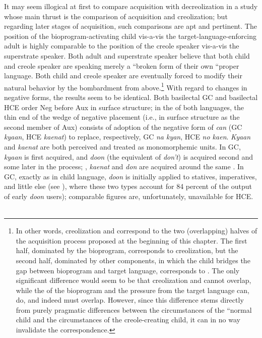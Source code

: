 It may seem illogical at first to compare acquisition with de\-creolization in a study whose main thrust is the comparison of acquisi\-tion and creolization; but regarding later stages of acquisition, such comparisons are apt and pertinent. The position of the bioprogram-activating child vis-a-vis the target-language-enforcing adult is highly comparable to the position of the creole speaker vis-a-vis the superstrate speaker. Both adult and superstrate speaker believe that both child and creole speaker are speaking merely a ``broken form of their own ``proper language. Both child and creole speaker are eventually forced to modify their natural behavior by the bombardment from above.\footnote{In other words, creolization and  correspond to the two (overlapping) halves of the acquisition process proposed at the beginning of this chapter. The first half, dominated by the bioprogram, corresponds to creolization, but the second half, dominated by other components, in which the child bridges the gap between bioprogram and target language, corresponds to . The only significant difference would seem to be that creolization and  cannot overlap, while the  of the bioprogram and the pressure from the target language can, do, and indeed must overlap. However, since this difference stems directly from purely pragmatic differences between the circumstances of the ``normal child and the circumstances of the creole-creating child, it can in no way invalidate the correspondence.} With regard to changes in negative forms, the results seem to be identical. Both basilectal GC and basilectal HCE order Neg
before Aux in surface structure; in the  of both languages, the thin end of the wedge of  negative placement (i.e., in surface structure as the second member of Aux) consists of adoption of the negative form of \textit{can} (GC \textit{kyaan}, HCE \textit{kaenat}) to replace, respectively, GC \textit{na kyan}, HCE \textit{no kaen}. \textit{Kyaan} and \textit{kaenat} are both perceived and treated as monomorphemic units. In GC, \textit{kyaan} is first acquired, and \textit{doon} (the equivalent of \textit{don't}) is acquired second and some  later in the  process; , \textit{kaenat} and \textit{don} are acquired around the same . In GC, exactly as in child language, \textit{doon} is initially applied to statives, imperatives, and little else (see \citealt[Table~3.9]{Bickerton1975}), where these two types account for 84 percent of the output of early \textit{doon} users); comparable figures are, unfortunately, unavailable for HCE.\\\\

